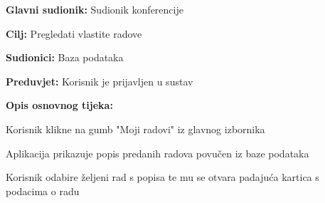 					\noindent {}
					\begin{packed_item}
						
						\item \textbf{Glavni sudionik: } Sudionik konferencije
						\item  \textbf{Cilj:} Pregledati vlastite radove
						\item  \textbf{Sudionici:} Baza podataka
						\item  \textbf{Preduvjet:} Korisnik je prijavljen u sustav
						\item  \textbf{Opis osnovnog tijeka:}
						
						\item[] \begin{packed_enum}
							
							\item Korisnik klikne na gumb "Moji radovi" iz glavnog izbornika
							\item Aplikacija prikazuje popis predanih radova povučen iz baze podataka
							\item Korisnik odabire željeni rad s popisa te mu se otvara padajuća kartica s podacima o radu
					
						\end{packed_enum}                
						
					\end{packed_item}
						\noindent {}
